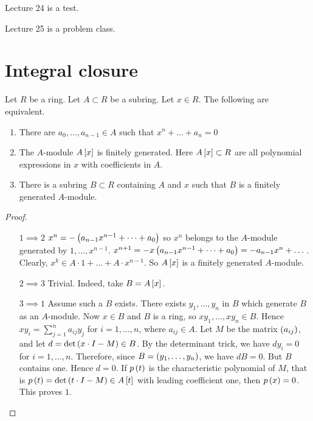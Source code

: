 
Lecture 24 is a test.


Lecture 25 is a problem class.

\pagebreak

\section{Integral closure}


\begin{theorem}
\label{thm:13.1}
Let $ R $ be a ring. Let $ A \subset R $ be a subring. Let $ x \in R $. The following are equivalent.
\begin{enumerate}
\item There are $ a_0, \dots, a_{n - 1} \in A $ such that $ x^n + \dots + a_n = 0 $
\item The $ A $-module $ A\sb{x} $ is finitely generated. Here $ A\sb{x} \subset R $ are all polynomial expressions in $ x $ with coefficients in $ A $.
\item There is a subring $ B \subset R $ containing $ A $ and $ x $ such that $ B $ is a finitely generated $ A $-module.
\end{enumerate}
\end{theorem}

\begin{proof}
\hfill
\begin{itemize}[leftmargin=0.5in]
\item[$ 1 \implies 2 $] $ x^n = -\rb{a_{n - 1}x^{n - 1} + \dots + a_0} $ so $ x^n $ belongs to the $ A $-module generated by $ 1, \dots, x^{n - 1} $. $ x^{n + 1} = -x\rb{a_{n - 1}x^{n - 1} + \dots + a_0} = -a_{n - 1}x^n + \dots $. Clearly, $ x^k \in A \cdot 1 + \dots + A \cdot x^{n - 1} $. So $ A\sb{x} $ is a finitely generated $ A $-module.
\item[$ 2 \implies 3 $] Trivial. Indeed, take $ B = A\sb{x} $.
\item[$ 3 \implies 1 $] Assume such a $ B $ exists. There exists $ y_1, \dots, y_n $ in $ B $ which generate $ B $ as an $ A $-module. Now $ x \in B $ and $ B $ is a ring, so $ xy_1, \dots, xy_n \in B $. Hence $ xy_i = \sum_{j = 1}^n a_{ij}y_j $ for $ i = 1, \dots, n $, where $ a_{ij} \in A $. Let $ M $ be the matrix $ \rb{a_{ij}} $, and let $ d = \det\rb{x \cdot I - M} \in B $. By the determinant trick, we have $ dy_i = 0 $ for $ i = 1, \dots, n $. Therefore, since $ B = \rb{y_1, \dots, y_n} $, we have $ dB = 0 $. But $ B $ contains one. Hence $ d = 0 $. If $ p\rb{t} $ is the characteristic polynomial of $ M $, that is $ p\rb{t} = \det\rb{t \cdot I - M} \in A\sb{t} $ with leading coefficient one, then $ p\rb{x} = 0 $. This proves $ 1 $.
\end{itemize}
\end{proof}

